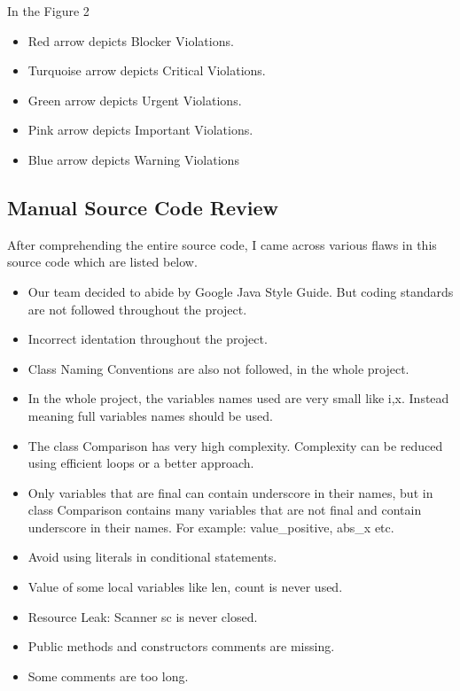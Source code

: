 \documentclass{article}
\begin{document}
\begin{flushleft}
In the Figure 2
\begin{itemize}
    \item Red arrow depicts Blocker Violations.
    \item Turquoise arrow depicts Critical Violations.
    \item Green arrow depicts  Urgent Violations.
    \item Pink arrow depicts Important Violations.
    \item Blue arrow depicts Warning Violations
\end{itemize}
\end{flushleft}
\subsection{Manual Source Code Review}
After comprehending the entire source code, I came across various flaws in this source code which are listed below.
 \begin{itemize}
     \item Our team decided to abide by Google Java Style Guide. But coding standards are not followed throughout the project.
     \item Incorrect identation throughout the project.
     \item Class Naming Conventions are also not followed, in the whole project.
     \item In the whole project, the variables names used are very small like i,x. Instead meaning full variables names should be used.
     \item The class Comparison has very high complexity. Complexity can be reduced using efficient loops or a better approach.
     \item Only variables that are final can contain underscore in their names, but in class Comparison contains many variables that are not final and contain underscore in their names. For example: value\_positive, abs\_x etc.
     \item Avoid using literals in conditional statements.
     \item Value of some local variables like len, count is never used.
     \item Resource Leak: Scanner sc is never closed.
     \item Public methods and constructors comments are missing.
     \item Some comments are too long.
     
 \end{itemize}
\end{document}
